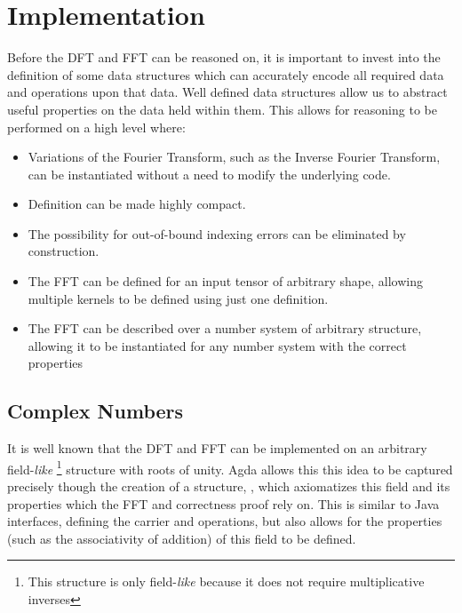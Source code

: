 \section{Implementation}

Before the DFT and FFT can be reasoned on, it is important to invest into the
definition of some data structures which can accurately encode all required data
and operations upon that data.
Well defined data structures allow us to abstract useful properties on the data
held within them.
This allows for reasoning to be performed on a high level where:
\begin{itemize}
\item Variations of the Fourier Transform, 
        such as the Inverse Fourier Transform, can be 
        instantiated without a need to modify the underlying code.
\item Definition can be made highly compact.
\item The possibility for out-of-bound indexing errors can be eliminated by 
        construction.
\item The FFT can be defined for an input tensor of arbitrary shape, allowing 
        multiple kernels to be defined using just one definition.
\item The FFT can be described over a number system of arbitrary structure,
        allowing it to be instantiated for any number system with the correct
        properties
\end{itemize}


\subsection{Complex Numbers}
\label{sec:complex_numbers}

It is well known \cite{TheDFT}
that the DFT and FFT can be implemented on an arbitrary field-\textit{like}
\footnote{This structure is only field-\textit{like} because it does not require multiplicative inverses}
structure with roots of unity.
Agda allows this this idea to be captured precisely though the creation of a
structure, , which axiomatizes this field and its properties which the FFT
and correctness proof rely on.
This is similar to Java interfaces, defining the carrier and operations, but also
allows for the properties (such as the associativity of addition) of this field to 
be defined.

